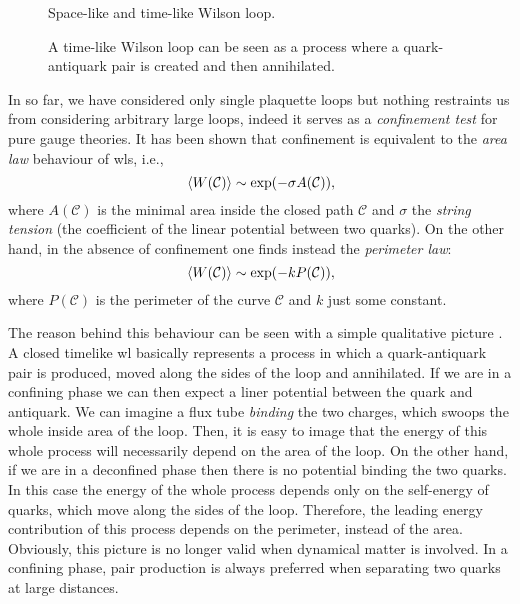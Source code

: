 \begin{figure}[t]
    \begin{minipage}[t]{0.48\textwidth}
        \centering
        \parbox[t][6cm][c]{\textwidth}{\centering}
        \caption{Space-like and time-like Wilson loop.}
    \end{minipage}
    \hfill
    \begin{minipage}[t]{0.48\textwidth}
        \parbox[t][6cm][c]{\textwidth}{\centering}
        \caption[Quark-antiquark pair]{A time-like Wilson loop can be seen as a process where a quark-antiquark pair is created and then annihilated.}
    \end{minipage}
\end{figure}

In so far, we have considered only single plaquette loops but nothing restraints us from considering arbitrary large loops, indeed it serves as a \emph{confinement test} for pure gauge theories.
It has been shown \cite{wilson1974confinement} that confinement is equivalent to the \emph{area law} behaviour of \ac{wl}s, i.e.,
\begin{equation}
    \ev*{W(\mathcal{C})} \sim \exp(- \sigma A(\mathcal{C})),
    \label{eq:wilson_area_law}
\end{equation}
where $A(\mathcal{C})$ is the minimal area inside the closed path $\mathcal{C}$ and $\sigma$ the \emph{string tension} (the coefficient of the linear potential between two quarks).
On the other hand, in the absence of confinement one finds instead the \emph{perimeter law}:
\begin{equation}
    \ev*{W(\mathcal{C})} \sim \exp(- k P(\mathcal{C})),
    \label{eq:wilson_perimeter_law}
\end{equation}
where $P(\mathcal{C})$ is the perimeter of the curve $\mathcal{C}$ and $k$ just some constant.


The reason behind this behaviour can be seen with a simple qualitative picture \cite{creutz1985book, wilson1974confinement}.
A closed timelike \ac{wl} basically represents a process in which a quark-antiquark pair is produced, moved along the sides of the loop and annihilated.
If we are in a confining phase we can then expect a liner potential between the quark and antiquark.
We can imagine a flux tube \emph{binding} the two charges, which swoops the whole inside area of the loop.
Then, it is easy to image that the energy of this whole process will necessarily depend on the area of the loop.
On the other hand, if we are in a deconfined phase then there is no potential binding the two quarks.
In this case the energy of the whole process depends only on the self-energy of quarks, which move along the sides of the loop.
Therefore, the leading energy contribution of this process depends on the perimeter, instead of the area.
Obviously, this picture is no longer valid when dynamical matter is involved.
In a confining phase, pair production is always preferred when separating two quarks at large distances.

